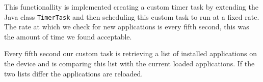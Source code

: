 This functionallity is implemented creating a custom timer task by extending the Java class \lstinline!TimerTask! and then scheduling this custom task to run at a fixed rate. The rate at which we check for new applications is every fifth second, this was the amount of time we found acceptable.

Every fifth second our custom task is retrieving a list of installed applications on the device and is comparing this list with the current loaded applications. If the two lists differ the applications are reloaded.